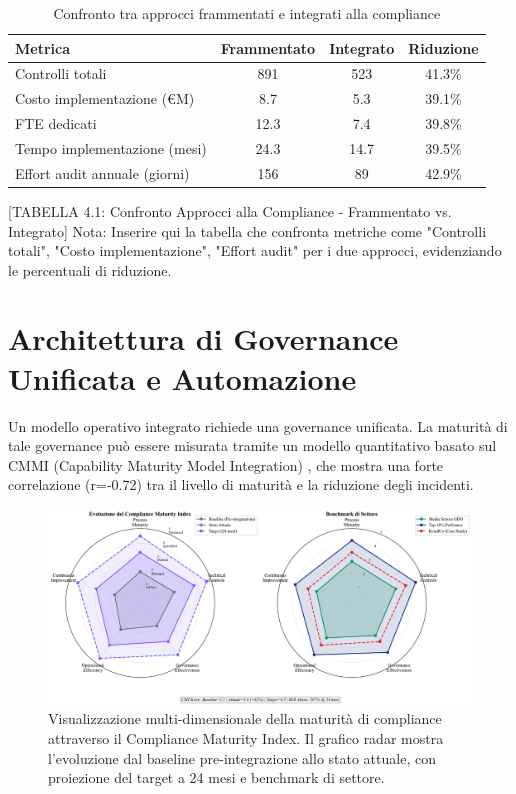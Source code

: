 \begin{table}[h]
\centering
\caption{Confronto tra approcci frammentati e integrati alla compliance}
\label{tab:confronto_compliance}
\begin{tabular}{|l|c|c|c|}
\hline
\textbf{Metrica} & \textbf{Frammentato} & \textbf{Integrato} & \textbf{Riduzione} \\
\hline
Controlli totali & 891 & 523 & 41.3\% \\
Costo implementazione (€M) & 8.7 & 5.3 & 39.1\% \\
FTE dedicati & 12.3 & 7.4 & 39.8\% \\
Tempo implementazione (mesi) & 24.3 & 14.7 & 39.5\% \\
Effort audit annuale (giorni) & 156 & 89 & 42.9\% \\
\hline
\end{tabular}
\end{table}

[TABELLA 4.1: Confronto Approcci alla Compliance - Frammentato vs. Integrato]
Nota: Inserire qui la tabella che confronta metriche come "Controlli totali", "Costo implementazione", "Effort audit" per i due approcci, evidenziando le percentuali di riduzione.

\section{Architettura di Governance Unificata e Automazione}

Un modello operativo integrato richiede una governance unificata. La maturità di tale governance può essere misurata tramite un modello quantitativo basato sul CMMI (Capability Maturity Model Integration) \autocite{CMMI2023}, che mostra una forte correlazione (r=-0.72) tra il livello di maturità e la riduzione degli incidenti.

\begin{figure}[htbp]
\centering
\includegraphics[width=\textwidth]{thesis_figures/cap4/figura_4_2_cmi_radar.pdf}
\caption{Visualizzazione multi-dimensionale della maturità di compliance attraverso il Compliance Maturity Index. Il grafico radar mostra l'evoluzione dal baseline pre-integrazione allo stato attuale, con proiezione del target a 24 mesi e benchmark di settore.}
\label{fig:cmi_radar}
\end{figure}

